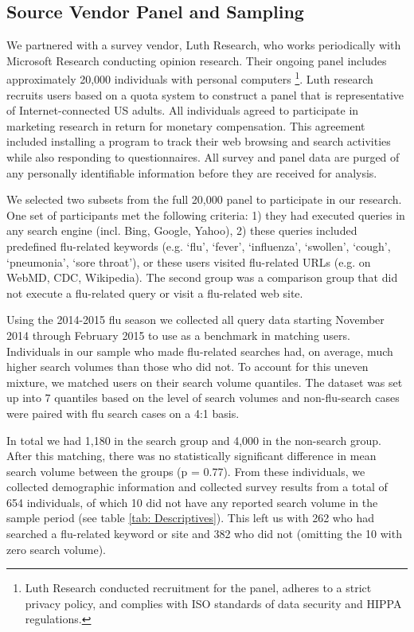 \documentclass[12pt]{article}
\begin{document}
\subsection{Source Vendor Panel and Sampling}
We partnered with a survey vendor, Luth Research, who works periodically with Microsoft Research conducting opinion research. Their ongoing panel includes approximately 20,000 individuals with personal computers  \footnote{Luth Research conducted recruitment for the panel, adheres to a strict privacy policy, and complies with ISO standards of data security and HIPPA regulations.}. Luth research recruits users based on a quota system to construct a panel that is representative of Internet-connected US adults. All individuals agreed to participate in marketing research in return for monetary compensation. This agreement included installing a program to track their web browsing and search activities while also responding to questionnaires. All survey and panel data are purged of any personally identifiable information before they are received for analysis.  

We selected two subsets from the full 20,000 panel to participate in our research. One set of participants met the following criteria: 1) they had executed queries in any search engine (incl. Bing, Google, Yahoo), 2) these queries included predefined flu-related keywords (e.g. `flu', `fever', `influenza', `swollen', `cough', `pneumonia', `sore throat'), or these users visited flu-related URLs (e.g. on WebMD, CDC, Wikipedia). The second group was a comparison group that did not execute a flu-related query or visit a flu-related web site. 

Using the 2014-2015 flu season we collected all query data starting November 2014 through February 2015 to use as a benchmark in matching users. Individuals in our sample who made flu-related searches had, on average, much higher search volumes than those who did not. To account for this uneven mixture, we matched users on their search volume quantiles. The dataset was set up into 7 quantiles based on the level of search volumes and non-flu-search cases were paired with flu search cases on a 4:1 basis. 

In total we had 1,180 in the search group and 4,000 in the non-search group. After this matching, there was no statistically significant difference in mean search volume between the groups (p = 0.77). From these individuals, we collected demographic information and collected survey results from a total of 654 individuals, of which 10 did not have any reported search volume in the sample period (see table \ref{tab: Descriptives}). This left us with 262 who had searched a flu-related keyword or site and 382 who did not (omitting the 10 with zero search volume). 
\end{document}
